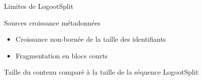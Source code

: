 \begin{frame}{Limites de LogootSplit}
    \begin{block}{Sources croissance métadonnées}
        \begin{itemize}
            \item Croissance non-bornée de la taille des identifiants
            \item Fragmentation en blocs courts
        \end{itemize}
    \end{block}
    \pause
    \begin{block}{Taille du contenu comparé à la taille de la séquence LogootSplit}
        \begin{figure}
        \end{figure}
    \end{block}
\end{frame}

